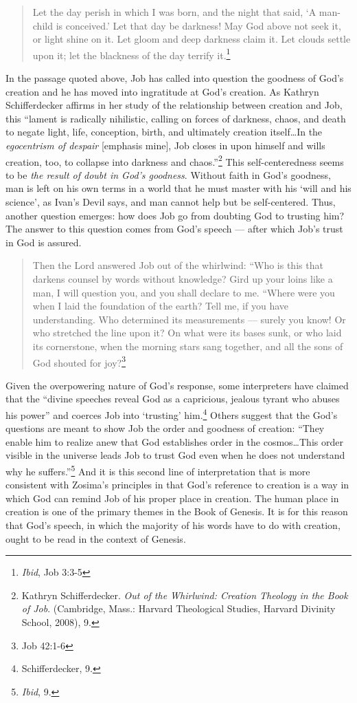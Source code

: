 \begin{quote}
\singlespacing
Let the day perish in which I was born, and the night that said, `A man-child is conceived.' Let that day be darkness! May God above not seek it, or light shine on it. Let gloom and deep darkness claim it. Let clouds settle upon it; let the blackness of the day terrify it.\footnote{\emph{Ibid}, Job 3:3-5}
\end{quote} In the passage quoted above, Job has called into question the goodness of God's creation and he has moved into ingratitude at God's creation. As Kathryn Schifferdecker affirms in her study of the relationship between creation and Job, this ``lament is radically nihilistic, calling on forces of darkness, chaos, and death to negate light, life, conception, birth, and ultimately creation itself\ldots In the \emph{egocentrism of despair} [emphasis mine], Job closes in upon himself and wills creation, too, to collapse into darkness and chaos.''\footnote{Kathryn Schifferdecker. \emph{Out of the Whirlwind: Creation Theology in the Book of Job}. (Cambridge, Mass.: Harvard Theological Studies, Harvard Divinity School, 2008), 9.} This self-centeredness seems to be \emph{the result of doubt in God's goodness}. Without faith in God's goodness, man is left on his own terms in a world that he must master with his `will and his science', as Ivan's Devil says, and man cannot help but be self-centered. Thus, another question emerges: how does Job go from doubting God to trusting him? The answer to this question comes from God's speech --- after which Job's trust in God is assured.

\begin{quote}
\onehalfspacing
Then the Lord answered Job out of the whirlwind: ``Who is this that darkens counsel by words without knowledge? Gird up your loins like a man, I will question you, and you shall declare to me. ``Where were you when I laid the foundation of the earth? Tell me, if you have understanding. Who determined its measurements --- surely you know! Or who stretched the line upon it? On what were its bases sunk, or who laid its cornerstone, when the morning stars sang together, and all the sons of God shouted for joy?\footnote{Job 42:1-6}
\end{quote}

Given the overpowering nature of God's response, some interpreters have claimed that the ``divine speeches reveal God as a capricious, jealous tyrant who abuses his power'' and coerces Job into `trusting' him.\footnote{Schifferdecker, 9.} Others suggest that the God's questions are meant to show Job the order and goodness of creation: ``They enable him to realize anew that God establishes order in the cosmos\ldots This order visible in the universe leads Job to trust God even when he does not understand why he suffers.''\footnote{\emph{Ibid}, 9.} And it is this second line of interpretation that is more consistent with Zosima's principles in that God's reference to creation is a way in which God can remind Job of his proper place in creation. The human place in creation is one of the primary themes in the Book of Genesis. It is for this reason that God's speech, in which the majority of his words have to do with creation, ought to be read in the context of Genesis.

